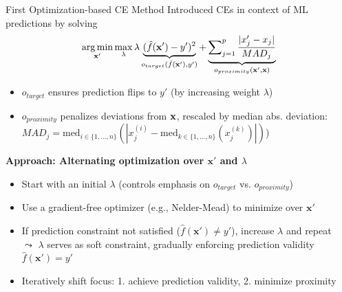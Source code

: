 \documentclass[10pt,compress,t,notes=noshow, xcolor=table]{beamer}
\begin{document}
\begin{frame}{First Optimization-based CE Method }
Introduced CEs in context of ML predictions by solving
		$$
			\mathop{\mathrm{arg\,min}}_{\mathbf{x}'} \max_{\lambda} \lambda \underbrace{(\hat{f}(\mathbf{x}') - y')^2}_{o_{target}(\hat{f}(\mathbf{x}'), y')} + \underbrace{\sum\nolimits_{j = 1}^p \frac{|x'_j - x_j|}{MAD_j}}_{o_{proximity}(\mathbf{x}', \mathbf{x})}
		$$
\begin{itemize}
\item $o_{target}$ ensures prediction flips to $y'$ (by increasing weight $\lambda$)
\item $o_{proximity}$ penalizes deviations from $\mathbf{x}$, rescaled by median abs. deviation: $MAD_j = \text{med}_{i \in \{1, \dots, n\}} ( | x^{(i)}_j - \text{med}_{k\in \{1, \dots, n\}} (x^{(k)}_j) | )$)
\end{itemize}

\lz
\pause

\textbf{Approach: Alternating optimization over \(\mathbf{x}'\) and \(\lambda\)}

\begin{itemize}
  \item Start with an initial \(\lambda\) (controls emphasis on $o_{target}$ vs. $o_{proximity}$)
  \item Use a gradient-free optimizer (e.g., Nelder-Mead) to minimize over \(\mathbf{x}'\)
  \item If prediction constraint not satisfied (\(\hat{f}(\mathbf{x}') \ne y'\)), increase \(\lambda\) and repeat
  \\
  $\leadsto$ \(\lambda\) serves as soft constraint, gradually enforcing prediction validity \(\hat{f}(\mathbf{x}') = y'\)
  \item Iteratively shift focus: 1. achieve prediction validity, 2. minimize proximity%
\end{itemize}


	

\end{frame}
\end{document}
